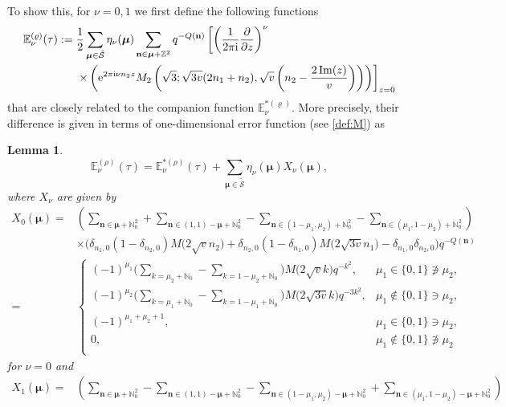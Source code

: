 \documentclass[pdftex]{sigma}
\def\BN{\mathbb{N}}
\def\BZ{\mathbb{Z}}
\def\BE{\mathbb{E}}
\def\CS{\mathcal{S}}
\def\ss{ \tilde{\mathcal{S}} }
\def\bon{\mathbf{n}}
\def\bos{\varrho}
\def\bmu{\boldsymbol{\mu}}
\def\bon{\boldsymbol{n}}
\def\im{\operatorname{Im}}
\newtheorem{lem}[thm]{Lemma}
\theoremstyle{definition}
\numberwithin{equation}{section}
\begin{document}
To show this, for $\nu =0, 1$ we first define the following functions
\begin{align}
\BE_\nu^{(\bos)}(\tau) :={}& \frac{1}{2} \sum_{\boldsymbol{\mu} \in \ss} \eta_\nu(\boldsymbol{\mu}) \sum_{\mathbf{n} \in \boldsymbol{\mu} + \BZ^2} q^{-Q(\mathbf{n})} \left[ \left({\frac{1}{2\pi {\rm i}}} {\frac{\partial}{\partial z}}\right)^\nu \right.\nonumber\\&
\left. \times\left({\rm e}^{2\pi {\rm i} \nu n_2 z} M_2 \left( \sqrt{3} ; \sqrt{3v} (2n_1 + n_2), \sqrt{v} \left(n_2 - {\frac{2\im(z)}{v}}\right)\right) \right) \right]_{z=0} \label{def:E01starless}
\end{align}
that are closely related to the companion function $\BE_\nu^{*(\bos)}$. More precisely, their difference is given in terms of one-dimensional error function (see \eqref{def:M}) as
\begin{lem}\label{lem:Estar_vs_starless}
 \[
\mathbb{E}^{(\rho)}_{\nu}(\tau)=\mathbb{E}^{*(\rho)}_{\nu}(\tau)+\sum_{\bmu\in\tilde{\CS}}\eta_{\nu}(\bmu)X_\nu(\bmu),
\]
where $X_\nu$ are given by
\begin{align*}
 X_{0}( \bmu )={}& \left( \sum_{\bon\in\bmu+\BN_{0}^{2}}+\sum_{\bon\in( 1,1 )-\bmu+\BN_{0}^{2}}-\sum_{\bon\in(1-\mu_{1},\mu_{2})+\BN_{0}^{2}}-\sum_{\bon\in(\mu_{1},1-\mu_{2})+\BN_{0}^{2}} \right)\\
 &\times\bigl( \delta_{n_{1},0}( 1-\delta_{n_{2},0} )M\bigl( 2\sqrt{v}n_{2} \bigr)+\delta_{n_{2},0}( 1-\delta_{n_{1},0} )M\bigl( 2\sqrt{3v}n_{1} \bigr)-\delta_{n_{1},0}\delta_{n_{2},0} \bigr)q^{-Q( \bon)}\\
 ={}& \begin{cases}
 ( -1 )^{\mu_{1}}\bigl( \sum_{k=\mu_{2}+\BN_{0}}-\sum_{k=1-\mu_{2}+\BN_{0}} \bigr)M\bigl( 2\sqrt{v}k \bigr)q^{-k^{2}},& \mu_{1}\in\{ 0,1 \}\not \ni \mu_{2},\\
 ( -1 )^{\mu_{2}}\bigl( \sum_{k=\mu_{1}+\BN_{0}}-\sum_{k=1-\mu_{1}+\BN_{0}} \bigr)M\bigl( 2\sqrt{3v}k \bigr)q^{-3k^{2}},& \mu_{1}\not\in\{ 0,1 \}\ni\mu_{2},\\
 ( -1 )^{\mu_{1}+\mu_{2}+1},& \mu_{1}\in\{ 0,1 \}\ni\mu_{2},\\
 0,& \mu_{1}\not\in\{ 0,1 \}\not \ni \mu_{2}\\
 \end{cases}
\end{align*}
for $\nu = 0$ and
\begin{align*}
 X_{1}( \bmu )={}& \left( \sum_{\bon\in\bmu+\BN_{0}^{2}}-\sum_{\bon\in\left( 1,1 \right)-\bmu+\BN_{0}^{2}}-\sum_{\bon\in( 1-\mu_{1},\mu_{2} )-\bmu+\BN_{0}^{2}}+\sum_{\bon\in(\mu_{1},1-\mu_{2} )-\bmu+\BN_{0}^{2}} \right)\\

\end{align*}
\end{lem}
\end{document}
